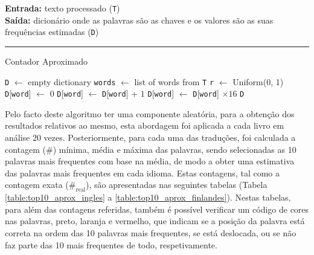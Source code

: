 \documentclass[mirror, portugues]{revdetua}
\begin{document}
\begin{algorithm}[H]
\raggedright
\textbf{Entrada:} texto processado (\texttt{T}) \\
\textbf{Saída:} dicionário onde as palavras são as chaves e os valores são as suas frequências estimadas (\texttt{D})\\
\hrule 
\caption{Contador Aproximado}
\begin{algorithmic}[1]
    \State \texttt{D} $\gets$ empty dictionary
    \State \texttt{words} $\gets$ list of words from \texttt{T}
    \State \texttt{r} $\gets$ Uniform(0, 1)
            \State \texttt{D}[\texttt{word}] $\gets$ 0
        \EndIf
        \State \texttt{D}[\texttt{word}] $\gets$ \texttt{D}[\texttt{word}] + $1$
    \EndIf
    \EndFor
     
    \State \texttt{D}[\texttt{word}] $\gets$ \texttt{D}[\texttt{word}] $\times 16$
    \EndFor
    \State \Return \texttt{D}
\end{algorithmic}
\end{algorithm}

Pelo facto deste algoritmo ter uma componente aleatória, para a obtenção dos resultados relativos ao mesmo, esta abordagem foi aplicada a cada livro em análise 20 vezes. Posteriormente, para cada uma das traduções, foi calculada a contagem (\#) mínima, média e máxima das palavras, sendo selecionadas as 10 palavras mais frequentes com base na média, de modo a obter uma estimativa das palavras mais frequentes em cada idioma. Estas contagens, tal como a contagem exata ($\text{\#}_\text{real}$), são apresentadas nas seguintes tabelas (Tabela \ref{table:top10_aprox_ingles} a \ref{table:top10_aprox_finlandes}). Nestas tabelas, para além das contagens referidas, também é possível verificar um código de cores nas palavras, preto, laranja e vermelho, que indicam se a posição da palavra está correta na ordem das 10 palavras mais frequentes, se está deslocada, ou se não faz parte das 10 mais frequentes de todo, respetivamente.
\end{document}
